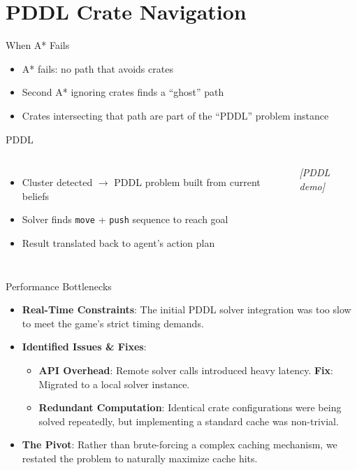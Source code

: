 \section{PDDL Crate Navigation}
\begin{frame}{When A* Fails}
    \begin{itemize}
        \item A* fails: no path that avoids crates
        \item Second A* ignoring crates finds a ``ghost'' path
        \item Crates intersecting that path are part of the ``PDDL'' problem instance
    \end{itemize}
\end{frame}

\begin{frame}{PDDL}
  \begin{columns}
      \begin{itemize}
        \item Cluster detected $\to$ PDDL problem built from current beliefs
        \item Solver finds \texttt{move} + \texttt{push} sequence to reach goal
        \item Result translated back to agent's action plan
      \end{itemize}
      \begin{block}{}
        \centering\textit{[PDDL demo]}
      \end{block}
  \end{columns}
\end{frame}

\begin{frame}{Performance Bottlenecks}
  \begin{itemize}
    \item \textbf{Real-Time Constraints}: The initial PDDL solver integration was too slow to meet the game's strict timing demands.
    \item \textbf{Identified Issues \& Fixes}:
    \begin{itemize}
      \item \textbf{API Overhead}: Remote solver calls introduced heavy latency. \textbf{Fix}: Migrated to a local solver instance.
      \item \textbf{Redundant Computation}: Identical crate configurations were being solved repeatedly, but implementing a standard cache was non-trivial.
    \end{itemize}
    \item \textbf{The Pivot}: Rather than brute-forcing a complex caching mechanism, we restated the problem to naturally maximize cache hits.
  \end{itemize}
\end{frame}


